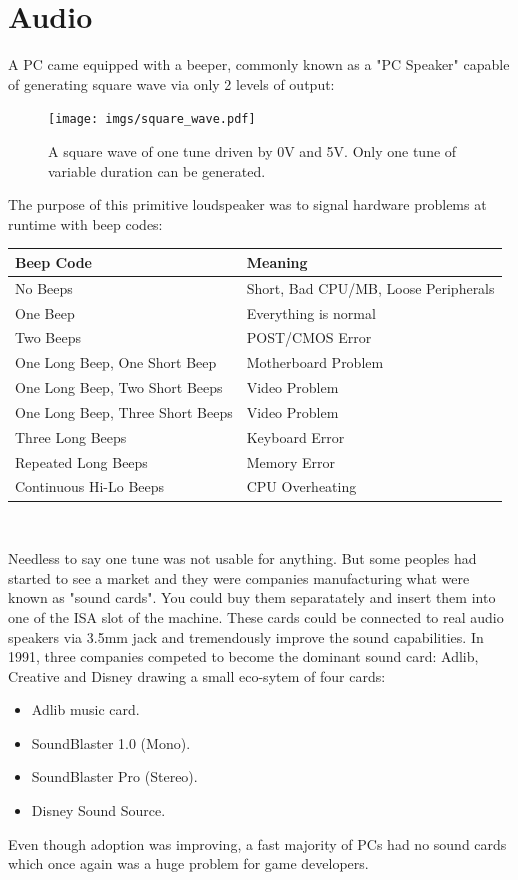 \documentclass[book.tex]{subfiles}
\begin{document}
\section{Audio}
A PC came equipped with a beeper, commonly known as a "PC Speaker" capable of generating square wave via only 2 levels of output:\\
\par
 \begin{figure}[H]
\centering
\texttt{[image: imgs/square\_wave.pdf]}
\caption{A square wave of one tune driven by 0V and 5V. Only one tune of variable duration can be generated.}
\end{figure}

\par
 The purpose of this primitive loudspeaker was to signal hardware problems at runtime with beep codes:\\
\par
\begin{tabularx}{\textwidth}{l l}
\textbf{Beep Code} & \textbf{Meaning}  \\ \hline
No Beeps                         & Short, Bad CPU/MB, Loose Peripherals \\ \hline
One Beep                         & Everything is normal\\ \hline
Two Beeps                        & POST/CMOS Error \\ \hline 
One Long Beep, One Short Beep    & Motherboard Problem \\ \hline
One Long Beep, Two Short Beeps   & Video Problem \\ \hline
One Long Beep, Three Short Beeps & Video Problem \\ \hline
Three Long Beeps                 & Keyboard Error \\ \hline
Repeated Long Beeps              & Memory Error \\ \hline
Continuous Hi-Lo Beeps           & CPU Overheating \\ \hline
\end{tabularx}\\
\bigskip
\par
Needless to say one tune was not usable for anything. But some peoples had started to see a market and they were companies manufacturing what were known as "sound cards". You could buy them separatately and insert them into one of the ISA slot of the machine. These cards could be connected to real audio speakers via 3.5mm jack and tremendously improve the sound capabilities. In 1991, three companies competed to become the dominant sound card: Adlib, Creative and Disney drawing a small eco-sytem of four cards:\\
\par
\begin{itemize}
\item Adlib music card.
\item SoundBlaster 1.0 (Mono).
\item SoundBlaster Pro (Stereo).
\item Disney Sound Source.
\end{itemize}
\par
Even though adoption was improving, a fast majority of PCs had no sound cards which once again was a huge problem for game developers.
\end{document}
